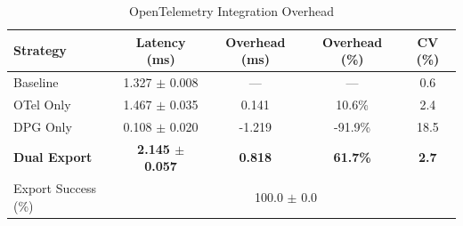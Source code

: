 
\begin{table}[t]
\centering
\caption{OpenTelemetry Integration Overhead}
\label{tab:otel_overhead}
\begin{tabular}{lcccc}
\toprule
Strategy & Latency (ms) & Overhead (ms) & Overhead (\%) & CV (\%) \\
\midrule
Baseline & 1.327 $\pm$ 0.008 & --- & --- & 0.6 \\
OTel Only & 1.467 $\pm$ 0.035 & 0.141 & 10.6\% & 2.4 \\
DPG Only & 0.108 $\pm$ 0.020 & -1.219 & -91.9\% & 18.5 \\
\textbf{Dual Export} & \textbf{2.145 $\pm$ 0.057} & \textbf{0.818} & \textbf{61.7\%} & \textbf{2.7} \\
\midrule
Export Success (\%) & \multicolumn{4}{c}{100.0 $\pm$ 0.0} \\
\bottomrule
\end{tabular}
\end{table}
